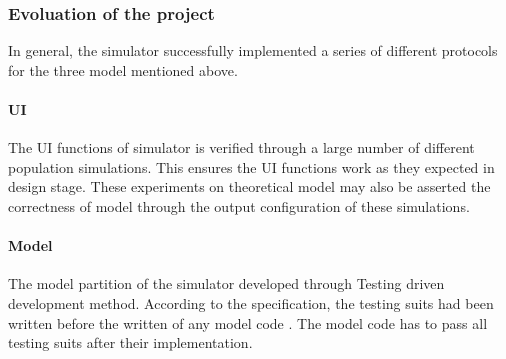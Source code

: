 \subsubsection{Evoluation of the project}

\par\noindent
In general, the simulator successfully implemented a series of different protocols for the three model mentioned above.

\paragraph{UI} The UI functions of simulator is verified through a large number of different population simulations. This ensures the UI functions work as they expected in design stage.
These experiments on theoretical model may also be asserted the correctness of model through the output configuration of these simulations.

\paragraph{Model} The model partition of the simulator developed through Testing driven development method. According to the specification, the testing suits had been written before the written of any
model code . The model code has to pass all testing suits after their implementation.
